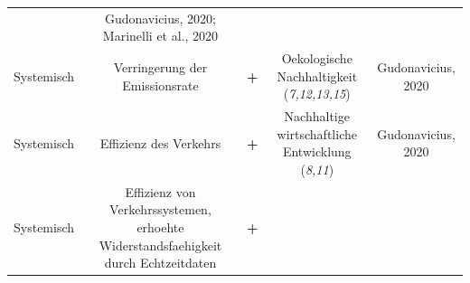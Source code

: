\documentclass[
]{book}
\begin{document}
\begin{longtable}[]{@{}ccccc@{}}
\begin{minipage}[t]{0.17\columnwidth}
\end{minipage} & \begin{minipage}[t]{0.17\columnwidth}\centering
Gudonavicius, 2020; Marinelli et al., 2020\strut
\end{minipage}\tabularnewline
\begin{minipage}[t]{0.17\columnwidth}\centering
Systemisch\strut
\end{minipage} & \begin{minipage}[t]{0.16\columnwidth}\centering
Verringerung der Emissionsrate\strut
\end{minipage} & \begin{minipage}[t]{0.17\columnwidth}\centering
\textbf{+}\strut
\end{minipage} & \begin{minipage}[t]{0.17\columnwidth}\centering
Oekologische Nachhaltigkeit (\emph{7,12,13,15})\strut
\end{minipage} & \begin{minipage}[t]{0.17\columnwidth}\centering
Gudonavicius, 2020\strut
\end{minipage}\tabularnewline
\begin{minipage}[t]{0.17\columnwidth}\centering
Systemisch\strut
\end{minipage} & \begin{minipage}[t]{0.16\columnwidth}\centering
Effizienz des Verkehrs\strut
\end{minipage} & \begin{minipage}[t]{0.17\columnwidth}\centering
\textbf{+}\strut
\end{minipage} & \begin{minipage}[t]{0.17\columnwidth}\centering
Nachhaltige wirtschaftliche Entwicklung (\emph{8,11})\strut
\end{minipage} & \begin{minipage}[t]{0.17\columnwidth}\centering
Gudonavicius, 2020\strut
\end{minipage}\tabularnewline
\begin{minipage}[t]{0.17\columnwidth}\centering
Systemisch\strut
\end{minipage} & \begin{minipage}[t]{0.16\columnwidth}\centering
Effizienz von Verkehrssystemen, erhoehte Widerstandsfaehigkeit durch Echtzeitdaten\strut
\end{minipage} & \begin{minipage}[t]{0.17\columnwidth}\centering
\textbf{+}\strut
\end{minipage} & \begin{minipage}[t]{0.17\columnwidth}\centering

\end{minipage}
\end{longtable}
\end{document}
